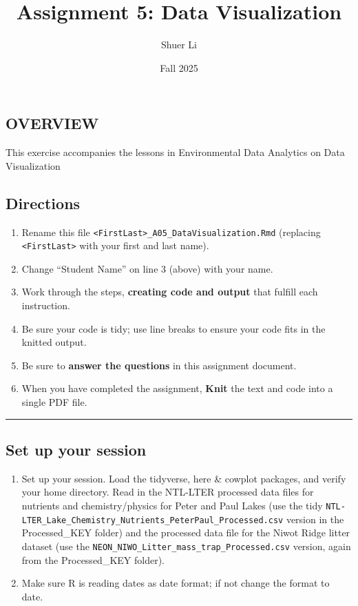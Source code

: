 \documentclass[
]{article}
\title{Assignment 5: Data Visualization}
\author{Shuer Li}
\date{Fall 2025}
\providecommand{\tightlist}{%
  \setlength{\itemsep}{0pt}\setlength{\parskip}{0pt}}
\begin{document}
\maketitle

\subsection{OVERVIEW}\label{overview}

This exercise accompanies the lessons in Environmental Data Analytics on
Data Visualization

\subsection{Directions}\label{directions}

\begin{enumerate}
\def\labelenumi{\arabic{enumi}.}
\tightlist
\item
  Rename this file
  \texttt{\textless{}FirstLast\textgreater{}\_A05\_DataVisualization.Rmd}
  (replacing \texttt{\textless{}FirstLast\textgreater{}} with your first
  and last name).
\item
  Change ``Student Name'' on line 3 (above) with your name.
\item
  Work through the steps, \textbf{creating code and output} that fulfill
  each instruction.
\item
  Be sure your code is tidy; use line breaks to ensure your code fits in
  the knitted output.
\item
  Be sure to \textbf{answer the questions} in this assignment document.
\item
  When you have completed the assignment, \textbf{Knit} the text and
  code into a single PDF file.
\end{enumerate}

\begin{center}\rule{0.5\linewidth}{0.5pt}\end{center}

\subsection{Set up your session}\label{set-up-your-session}

\begin{enumerate}
\def\labelenumi{\arabic{enumi}.}
\item
  Set up your session. Load the tidyverse, here \& cowplot packages, and
  verify your home directory. Read in the NTL-LTER processed data files
  for nutrients and chemistry/physics for Peter and Paul Lakes (use the
  tidy
  \texttt{NTL-LTER\_Lake\_Chemistry\_Nutrients\_PeterPaul\_Processed.csv}
  version in the Processed\_KEY folder) and the processed data file for
  the Niwot Ridge litter dataset (use the
  \texttt{NEON\_NIWO\_Litter\_mass\_trap\_Processed.csv} version, again
  from the Processed\_KEY folder).
\item
  Make sure R is reading dates as date format; if not change the format
  to date.
\end{enumerate}
\end{document}
